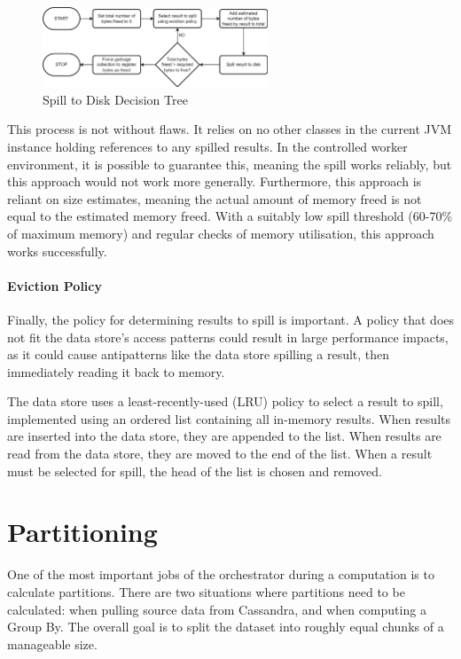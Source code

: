 \begin{figure}[h]
	\centering
	\includegraphics[width=0.6\textwidth]{chapters/diagrams/implementation/spill-to-disk-process}
	\caption{Spill to Disk Decision Tree}
	\label{fig:spill-to-disk-process}
\end{figure}

This process is not without flaws. It relies on no other classes in the current JVM instance holding references to any spilled results. In the controlled worker environment, it is possible to guarantee this, meaning the spill works reliably, but this approach would not work more generally. Furthermore, this approach is reliant on size estimates, meaning the actual amount of memory freed is not equal to the estimated memory freed. With a suitably low spill threshold (60-70\% of maximum memory) and regular checks of memory utilisation, this approach works successfully.

\paragraph{Eviction Policy}
Finally, the policy for determining results to spill is important. A policy that does not fit the data store's access patterns could result in large performance impacts, as it could cause antipatterns like the data store spilling a result, then immediately reading it back to memory.

The data store uses a least-recently-used (LRU) policy to select a result to spill, implemented using an ordered list containing all in-memory results. When results are inserted into the data store, they are appended to the list. When results are read from the data store, they are moved to the end of the list. When a result must be selected for spill, the head of the list is chosen and removed.



\section{Partitioning}
One of the most important jobs of the orchestrator during a computation is to calculate partitions. There are two situations where partitions need to be calculated: when pulling source data from Cassandra, and when computing a Group By. The overall goal is to split the dataset into roughly equal chunks of a manageable size. 

